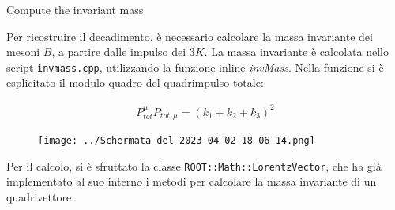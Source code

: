 \documentclass[8pt,a4paper]{beamer}
\begin{document}
\begin{frame}{Compute the invariant mass}

Per ricostruire il decadimento, è necessario calcolare la massa invariante dei mesoni $B$, a partire dalle impulso dei $3K$. La massa invariante è calcolata nello script \texttt{invmass.cpp}, utilizzando la funzione inline \textit{invMass}. Nella funzione si è esplicitato il modulo quadro del quadrimpulso totale:

\begin{align*}
P_{tot}^{\mu}P_{tot,\mu} = (k_{1} + k_{2} + k_{3})^{2}
\end{align*}

\begin{figure}[hbtp]
\centering
\texttt{[image: ../Schermata del 2023-04-02 18-06-14.png]}
\end{figure}

Per il calcolo, si è sfruttato la classe \texttt{ROOT::Math::LorentzVector}, che ha già implementato al suo interno i metodi per calcolare la massa invariante di un quadrivettore.

\end{frame}
\end{document}

